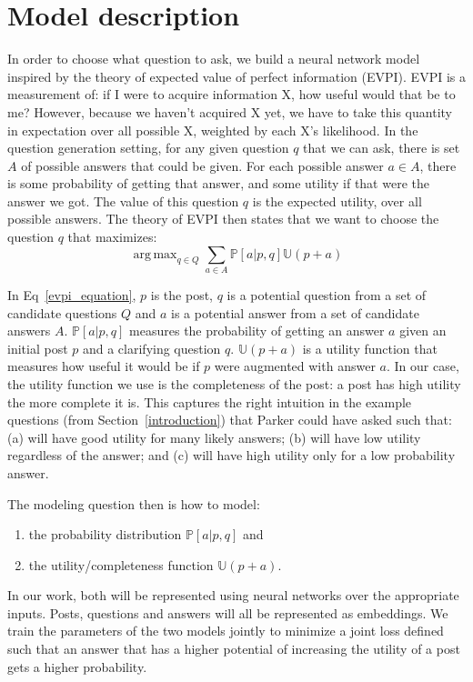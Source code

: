 \documentclass[11pt]{report}
\DeclareMathOperator*{\argmax}{arg\,max}
\newcommand{\U}{\mathbb{U}}
\begin{document}
\section{Model description}\label{model}

In order to choose what question to ask, we build a neural network model inspired by the theory of expected value of perfect information (EVPI). EVPI is a measurement of: if I were to acquire information X, how useful would that be to me? However, because we haven't acquired X yet, we have to take this quantity in expectation over all possible X, weighted by each X's likelihood. In the question generation setting, for any given question $q$ that we can ask, there is set $A$ of possible answers that could be given. For each possible answer $a \in A$, there is some probability of getting that answer, and some utility if that were the answer we got. The value of this question $q$ is the expected utility, over all possible answers. The theory of EVPI then states that we want to choose the question $q$ that maximizes:
\begin{equation}\label{evpi_equation}
\argmax_{q \in Q} \sum_{a \in A} \mathbb{P}[a | p,q] \U(p+a)
\end{equation} 

In Eq~\ref{evpi_equation}, $p$ is the post, $q$ is a potential question from a set of candidate questions $Q$ and $a$ is a potential answer from a set of candidate answers $A$. $\mathbb{P}[a | p,q]$ measures the probability of getting an answer $a$ given an initial post $p$ and a clarifying question $q$. $\U(p+a)$ is a utility function that measures how useful it would be if $p$ were augmented with answer $a$. In our case, the utility function we use is the completeness of the post: a post has high utility the more complete it is. This captures the right intuition in the example questions (from Section~\ref{introduction}) that Parker could have asked such that: \textsf{\small (a)} will have good utility for many likely answers;
\textsf{\small (b)} will have low utility regardless of the answer; and
\textsf{\small (c)} will have high utility only for a low probability answer.

The modeling question then is how to model: 
\begin{enumerate}
\item the probability distribution $\mathbb{P}[a | p,q]$ and
\item the utility/completeness function $\U(p+a)$.
\end{enumerate}
In our work, both will be represented using neural networks over the appropriate inputs. Posts, questions and answers will all be represented as embeddings. We train the parameters of the two models jointly to minimize a joint loss defined such that an answer that has a higher potential of increasing the utility of a post gets a higher probability.
\end{document}
